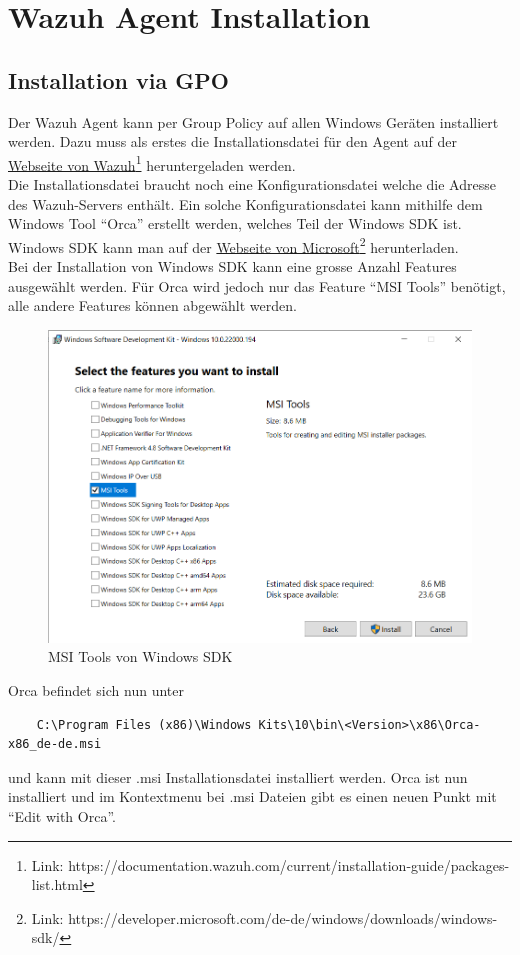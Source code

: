 \chapter{Wazuh Agent Installation}

\section{Installation via GPO}
Der Wazuh Agent kann per Group Policy auf allen Windows Geräten installiert werden.
Dazu muss als erstes die Installationsdatei für den Agent auf der \href{https://documentation.wazuh.com/current/installation-guide/packages-list.html}{Webseite von Wazuh}\footnote{Link: https://documentation.wazuh.com/current/installation-guide/packages-list.html} heruntergeladen werden.\\

Die Installationsdatei braucht noch eine Konfigurationsdatei welche die Adresse des Wazuh-Servers enthält.
Ein solche Konfigurationsdatei kann mithilfe dem Windows Tool ``Orca'' erstellt werden, welches Teil der Windows SDK ist. Windows SDK kann man auf der \href{https://developer.microsoft.com/de-de/windows/downloads/windows-sdk/}{Webseite von Microsoft}\footnote{Link: https://developer.microsoft.com/de-de/windows/downloads/windows-sdk/} herunterladen.\\

Bei der Installation von Windows SDK kann eine grosse Anzahl Features ausgewählt werden.
Für Orca wird jedoch nur das Feature ``MSI Tools'' benötigt, alle andere Features können abgewählt werden.
\begin{figure}[H]
    \centering
    \includegraphics[width=0.7\linewidth]{../img/agent/install-sdk.png}
    \caption{MSI Tools von Windows SDK}
\end{figure}

Orca befindet sich nun unter
\begin{lstlisting}
    C:\Program Files (x86)\Windows Kits\10\bin\<Version>\x86\Orca-x86_de-de.msi
\end{lstlisting}
und kann mit dieser .msi Installationsdatei installiert werden.
Orca ist nun installiert und im Kontextmenu bei .msi Dateien gibt es einen neuen Punkt mit ``Edit with Orca''.\\

